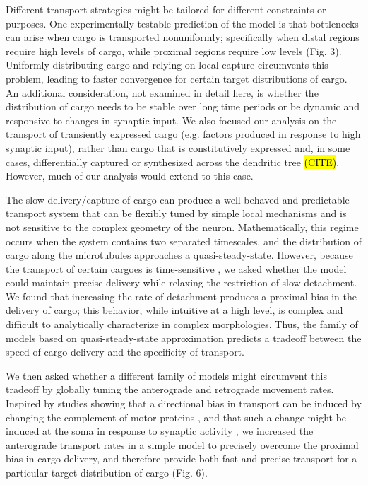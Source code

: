 \documentclass[11pt]{wlpeerj}
\begin{document}
Different transport strategies might be tailored for different constraints or purposes.
One experimentally testable prediction of the model is that bottlenecks can arise when cargo is transported nonuniformly; specifically when distal regions require high levels of cargo, while proximal regions require low levels (Fig. 3).
Uniformly distributing cargo and relying on local capture circumvents this problem, leading to faster convergence for certain target distributions of cargo.
An additional consideration, not examined in detail here, is whether the distribution of cargo needs to be stable over long time periods or be dynamic and responsive to changes in synaptic input.
We also focused our analysis on the transport of transiently expressed cargo (e.g. factors produced in response to high synaptic input), rather than cargo that is constitutively expressed and, in some cases, differentially captured or synthesized across the dendritic tree \hl{(CITE)}.
However, much of our analysis would extend to this case.

The slow delivery/capture of cargo can produce a well-behaved and predictable transport system that can be flexibly tuned by simple local mechanisms and is not sensitive to the complex geometry of the neuron.
Mathematically, this regime occurs when the system contains two separated timescales, and the distribution of cargo along the microtubules approaches a quasi-steady-state.
However, because the transport of certain cargoes is time-sensitive \citep{Frey_1997,Frey_1998}, we asked whether the model could maintain precise delivery while relaxing the restriction of slow detachment.
We found that increasing the rate of detachment produces a proximal bias in the delivery of cargo; this behavior, while intuitive at a high level, is complex and difficult to analytically characterize in complex morphologies.
Thus, the family of models based on quasi-steady-state approximation predicts a tradeoff between the speed of cargo delivery and the specificity of transport. 

We then asked whether a different family of models might circumvent this tradeoff by globally tuning the anterograde and retrograde movement rates. Inspired by studies showing that a directional bias in transport can be induced by changing the complement of motor proteins \citep{Kanai2004,Amrute2012}, and that such a change might be induced at the soma in response to synaptic activity \citep{Puthanveettil_2008}, we increased the anterograde transport rates in a simple model to precisely overcome the proximal bias in cargo delivery, and therefore provide both fast and precise transport for a particular target distribution of cargo (Fig. 6). 
\end{document}
